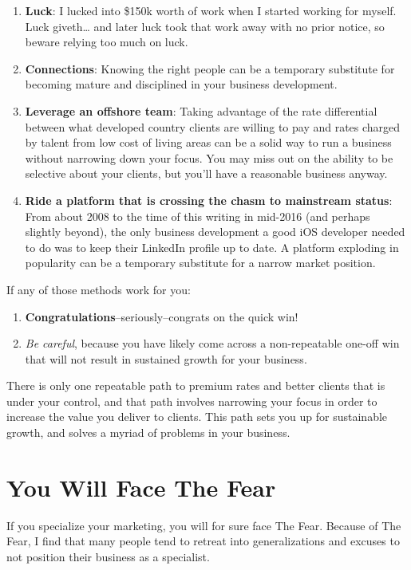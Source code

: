 \begin{enumerate}
\item \textbf{Luck}: I lucked into \$150k worth of work when I started working for myself. Luck giveth… and later luck took that work away with no prior notice, so beware relying too much on luck.
\item \textbf{Connections}: Knowing the right people can be a temporary substitute for becoming mature and disciplined in your business development.
\item \textbf{Leverage an offshore team}: Taking advantage of the rate differential between what developed country clients are willing to pay and rates charged by talent from low cost of living areas can be a solid way to run a business without narrowing down your focus. You may miss out on the ability to be selective about your clients, but you’ll have a reasonable business anyway.
\item \textbf{Ride a platform that is crossing the chasm to mainstream status}: From about 2008 to the time of this writing in mid-2016 (and perhaps slightly beyond), the only business development a good iOS developer needed to do was to keep their LinkedIn profile up to date. A platform exploding in popularity can be a temporary substitute for a narrow market position.
\end{enumerate}

If any of those methods work for you:

\begin{enumerate}
\item \textbf{Congratulations}--seriously--congrats on the quick win!
\item \emph{Be careful}, because you have likely come across a non-repeatable one-off win that will not result in sustained growth for your business.
\end{enumerate}

There is only one repeatable path to premium rates and better clients that is under your control, and that path involves narrowing your focus in order to increase the value you deliver to clients. This path sets you up for sustainable growth, and solves a myriad of problems in your business.

\section{You Will Face The Fear}

If you specialize your marketing, you will for sure face The Fear. Because of The Fear, I find that many people tend to retreat into generalizations and excuses to not position their business as a specialist.

